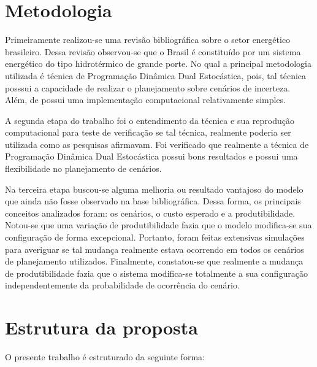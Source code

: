 \section{Metodologia}
Primeiramente realizou-se uma revis\~ao bibliogr\'afica sobre o setor energ\'etico brasileiro. Dessa revis\~ao
observou-se que o Brasil \'e constitu\'ido por um sistema energ\'etico do tipo hidrot\'ermico de grande porte. No qual a
principal metodologia utilizada \'e t\'ecnica de Programa\c c\~ao Din\^amica Dual Estoc\'astica, pois, tal t\'ecnica
posssui a capacidade de realizar o planejamento sobre cen\'arios de incerteza. Al\'em, de possui uma implementa\c c\~ao
computacional relativamente simples.

A segunda etapa do trabalho foi o entendimento da t\'ecnica e sua reprodu\c c\~ao computacional para teste de verifica\c
c\~ao se tal t\'ecnica, realmente poderia ser utilizada como as pesquisas afirmavam. Foi verificado que realmente a
t\'ecnica de Programa\c c\~ao Din\^amica Dual Estoc\'astica possui bons resultados e possui uma flexibilidade no
planejamento de cen\'arios. 

Na terceira etapa buscou-se alguma melhoria ou resultado vantajoso do modelo que ainda n\~ao fosse  observado na base
bibliogr\'afica. Dessa forma, os principais conceitos analizados foram: os cen\'arios, o custo esperado e a
produtibilidade. Notou-se que uma varia\c c\~ao de produtibilidade fazia que o modelo modifica-se sua configura\c c\~ao
de forma excepcional. Portanto, foram feitas extensivas simula\c c\~oes para averiguar se tal mudan\c ca realmente
estava ocorrendo em todos os cen\'arios de planejamento  utilizados. Finalmente, constatou-se que realmente a mudan\c ca
de produtibilidade fazia que o sistema modifica-se totalmente a sua configura\c c\~ao independentemente da probabilidade
de ocorr\^encia do cen\'ario.
\section{Estrutura da proposta}
O presente trabalho \'e estruturado da seguinte forma:

